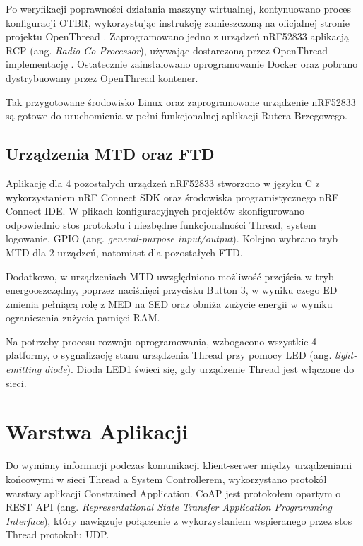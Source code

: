         Po weryfikacji poprawności działania maszyny wirtualnej, kontynuowano proces konfiguracji OTBR, wykorzystując instrukcję zamieszczoną na oficjalnej stronie projektu OpenThread \cite{otbr-docker}. Zaprogramowano jedno z urządzeń nRF52833 aplikacją RCP (ang. \textit{Radio Co-Processor}), używając dostarczoną przez OpenThread implementację \cite{otbr-rcp-app}. Ostatecznie zainstalowano oprogramowanie Docker oraz pobrano dystrybuowany przez OpenThread kontener.

        Tak przygotowane środowisko Linux oraz zaprogramowane urządzenie nRF52833 są gotowe do uruchomienia w pełni funkcjonalnej aplikacji Rutera Brzegowego.

    \subsection{Urządzenia MTD oraz FTD}
    \label{subsubsec:mtd-ftd-devices-implementation}

    Aplikację dla 4 pozostałych urządzeń nRF52833 stworzono w języku C z wykorzystaniem nRF Connect SDK oraz środowiska programistycznego nRF Connect IDE. W plikach konfiguracyjnych projektów skonfigurowano odpowiednio stos protokołu i niezbędne funkcjonalności Thread, system logowanie, GPIO (ang. \textit{general-purpose input/output}). Kolejno wybrano tryb MTD dla 2 urządzeń, natomiast dla pozostałych FTD. 

    Dodatkowo, w urządzeniach MTD uwzględniono możliwość przejścia w tryb energooszczędny, poprzez naciśnięci przycisku Button 3, w wyniku czego ED zmienia pełniącą rolę z MED na SED oraz obniża zużycie energii w wyniku ograniczenia zużycia pamięci RAM.

    Na potrzeby procesu rozwoju oprogramowania, wzbogacono wszystkie 4 platformy, o sygnalizację stanu urządzenia Thread przy pomocy LED (ang. \textit{light-emitting diode}). Dioda LED1 świeci się, gdy urządzenie Thread jest włączone do sieci.
    
\section{Warstwa Aplikacji}

    Do wymiany informacji podczas komunikacji klient-serwer między urządzeniami końcowymi w sieci Thread a System Controllerem, wykorzystano protokół warstwy aplikacji Constrained Application. CoAP jest protokołem opartym o REST API (ang. \textit{Representational State Transfer Application Programming Interface}), który nawiązuje połączenie z wykorzystaniem wspieranego przez stos Thread protokołu UDP.

